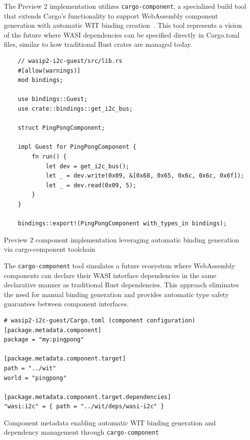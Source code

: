 The Preview 2 implementation utilizes \texttt{cargo-component}, a specialized build tool that extends Cargo's functionality to support WebAssembly component generation with automatic WIT binding creation~\cite{cargo_component_git}. This tool represents a vision of the future where WASI dependencies can be specified directly in Cargo.toml files, similar to how traditional Rust crates are managed today.

\begin{listing}[H]
    \begin{verbatim}
    // wasip2-i2c-guest/src/lib.rs
    #[allow(warnings)]
    mod bindings;
    
    use bindings::Guest;
    use crate::bindings::get_i2c_bus;
    
    struct PingPongComponent;
    
    impl Guest for PingPongComponent {
        fn run() {
            let dev = get_i2c_bus();
            let _ = dev.write(0x09, &[0x68, 0x65, 0x6c, 0x6c, 0x6f]);
            let _ = dev.read(0x09, 5);
        }
    }
    
    bindings::export!(PingPongComponent with_types_in bindings);
    \end{verbatim}
    \caption{Preview 2 component implementation leveraging automatic binding generation via cargo-component toolchain}
    \label{lst:preview2-guest}
\end{listing}

The \texttt{cargo-component} tool simulates a future ecosystem where WebAssembly components can declare their WASI interface dependencies in the same declarative manner as traditional Rust dependencies. This approach eliminates the need for manual binding generation and provides automatic type safety guarantees between component interfaces.

\begin{listing}[H]
\begin{verbatim}
# wasip2-i2c-guest/Cargo.toml (component configuration)
[package.metadata.component]
package = "my:pingpong"

[package.metadata.component.target]
path = "../wit"
world = "pingpong"

[package.metadata.component.target.dependencies]
"wasi:i2c" = { path = "../wit/deps/wasi-i2c" }
\end{verbatim}
\caption{Component metadata enabling automatic WIT binding generation and dependency management through \texttt{cargo-component}}
\label{lst:component-config}
\end{listing}

